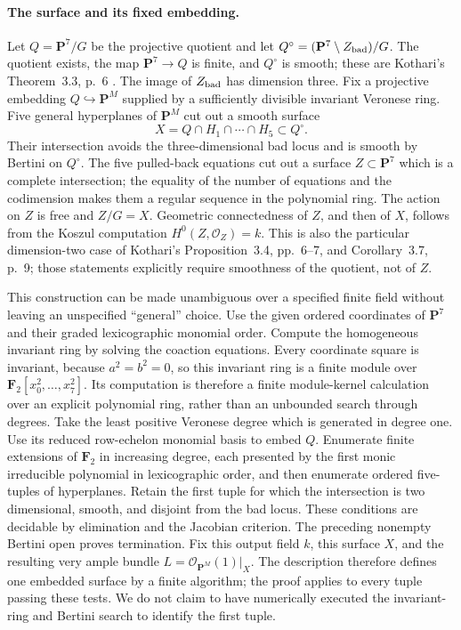 \paragraph{The surface and its fixed embedding.}
Let $Q=\mathbf P^7/G$ be the projective quotient and let
$Q^\circ=(\mathbf P^7\setminus Z_{\rm bad})/G$.  The quotient exists,
the map $\mathbf P^7\to Q$ is finite, and $Q^\circ$ is smooth;
these are Kothari's Theorem~3.3, p.~6
\cite{Kothari2026}.  The image of $Z_{\rm bad}$ has dimension three.
Fix a projective embedding $Q\hookrightarrow\mathbf P^M$ supplied
by a sufficiently divisible invariant Veronese ring.  Five general
hyperplanes of $\mathbf P^M$ cut out a smooth surface
\[
 X=Q\cap H_1\cap\cdots\cap H_5\subset Q^\circ.
\]
Their intersection avoids the three-dimensional bad locus and is
smooth by Bertini on $Q^\circ$.  The five pulled-back equations cut
out a surface $Z\subset\mathbf P^7$ which is a complete intersection;
the equality of the number of equations and the codimension makes
them a regular sequence in the polynomial ring.  The action on $Z$
is free and $Z/G=X$.  Geometric connectedness of $Z$, and then of
$X$, follows from the Koszul computation $H^0(Z,\mathcal O_Z)=k$.
This is also the particular dimension-two case of Kothari's
Proposition~3.4, pp.~6--7, and Corollary~3.7, p.~9; those statements
explicitly require smoothness of the quotient, not of $Z$.

This construction can be made unambiguous over a specified finite
field without leaving an unspecified ``general'' choice.  Use the
given ordered coordinates of $\mathbf P^7$ and their graded
lexicographic monomial order.  Compute the homogeneous invariant
ring by solving the coaction equations.  Every coordinate square is
invariant, because $a^2=b^2=0$, so this invariant ring is a finite
module over $\mathbf F_2[x_0^2,\ldots,x_7^2]$.  Its computation is
therefore a finite module-kernel calculation over an explicit
polynomial ring, rather than an unbounded search through degrees.
Take the least positive
Veronese degree which is generated in degree one.  Use its reduced
row-echelon monomial basis to embed $Q$.  Enumerate finite extensions
of $\mathbf F_2$ in increasing degree, each presented by the first
monic irreducible polynomial in lexicographic order, and then
enumerate ordered five-tuples of hyperplanes.  Retain the first
tuple for which the intersection is two dimensional, smooth, and
disjoint from the bad locus.  These conditions are decidable by
elimination and the Jacobian criterion.  The preceding nonempty
Bertini open proves termination.  Fix this output field $k$, this
surface $X$, and the resulting very ample bundle
$L=\mathcal O_{\mathbf P^M}(1)|_X$.
The description therefore defines one embedded surface by a finite
algorithm; the proof applies to every tuple passing these tests.
We do not claim to have numerically executed the invariant-ring and
Bertini search to identify the first tuple.

